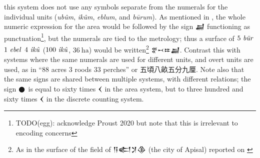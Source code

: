 \documentclass[10pt, a4paper, twoside]{article}
\begin{document}
this system does not use any symbols separate from the numerals
for the individual units (\emph{ubûm}, \emph{ikûm}, \emph{eblum}, and \emph{būrum}).
As mentioned in \cite{Robson2019}, the whole numeric expression for the area would be followed by the sign {\xsuxfont 𒃷}
functioning as punctuation\footnote{TODO(egg): acknowledge Proust 2020
  but note that this is irrelevant to encoding concerns}, but the numerals are tied to the metrology; thus
a surface of $5~\text{\emph{būr}}$ $1~\text{\emph{ebel}}$ $4~\text{\emph{ikû}}$ ($100~\text{\emph{ikû}}$, $36~\text{ha}$) would be written\footnote{As in the surface of the field of {\xsuxfont 𒀀𒅗𒋡𒆠} (the city of Apisal) reported on \cite[r.~1]{P102305}}
{\xsuxfont 𒐐𒑘𒐂𒃷}. Contrast this with systems
where the same numerals are used for different units,
and overt units are used, as in ``$88$ acres $3$ roods $33$ perches'' or {\hantfont 五頃八畝五分九厘}.
Note also that the same signs are shared between multiple systems,
with different relations; the sign {\xsuxfont 𒊹} is equal to sixty times {\xsuxfont 𒌋}
in the area system, but to three hundred and sixty times {\xsuxfont 𒌋} in the discrete counting system.
\end{document}
